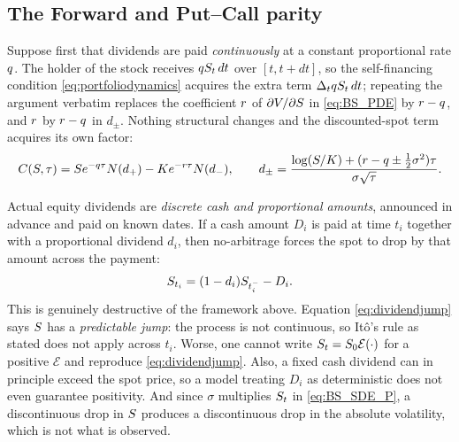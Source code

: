 \subsection{The Forward and Put--Call parity}\label{subsec:forward}


Suppose first that dividends are paid \emph{continuously} at a constant proportional rate $q$. 
The holder of the stock receives $q S_t\,dt$ over $[t,t+dt]$, so the self-financing condition 
\eqref{eq:portfoliodynamics} acquires the extra term $\Delta_t q S_t\,dt$; repeating the 
argument verbatim replaces the coefficient $r$ of $\partial V/\partial S$ in \eqref{eq:BS_PDE} 
by $r - q$, and $r$ by $r-q$ in $d_\pm$. Nothing structural changes and the discounted-spot term acquires its 
own factor:
\begin{equation}\label{eq:bscalldiv}
C(S,\tau) = S e^{-q\tau}N(d_+) - K e^{-r\tau}N(d_-), \qquad
d_\pm = \frac{\log(S/K) + (r-q \pm \tfrac12\sigma^2)\tau}{\sigma\sqrt{\tau}} .
\end{equation}



Actual equity dividends are \emph{discrete cash and proportional amounts}, announced in advance and paid on known 
dates. If a cash amount $D_i$ is paid at time $t_i$ together with a proportional dividend $d_i$, then no-arbitrage forces the spot to drop by that 
amount across the payment:
\begin{equation}\label{eq:dividendjump}
S_{t_i} = (1-d_i) S_{t_i^-} - D_i .
\end{equation}
This is genuinely destructive of the framework above.
Equation \eqref{eq:dividendjump} says $S$ has a \emph{predictable jump}: the process is not 
continuous, so Itô's rule as stated does not apply across $t_i$. Worse, one 
cannot write $S_t = S_0 \mathcal{E}(\cdot)$ for a positive $\mathcal{E}$ and reproduce 
\eqref{eq:dividendjump}. Also, a fixed cash dividend can in principle exceed the spot price, 
so a model treating $D_i$ as deterministic does not even guarantee positivity. And since 
$\sigma$ multiplies $S_t$ in \eqref{eq:BS_SDE_P}, a discontinuous drop in $S$ produces a 
discontinuous drop in the absolute volatility, which is not what is observed.

